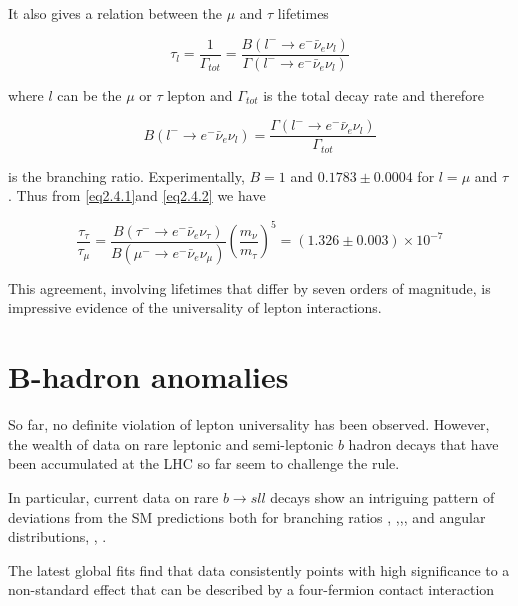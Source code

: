 	It also gives a relation between the $\mu$ and $\tau$ lifetimes 

	\begin{equation}
	\tau_{l}= \frac{1}{\Gamma_{tot}} = \frac{B(l^{-}\rightarrow e^{-}\bar{\nu}_{e}\nu_{l})}{\Gamma(l^{-}\rightarrow e^{-}\bar{\nu}_{e}\nu_{l})}
	\end{equation}

	where $l$ can be the $\mu$ or $\tau$ lepton and $\Gamma_{tot}$ is the total decay rate and therefore

	\begin{equation}
	B(l^{-}\rightarrow e^{-}\bar{\nu}_{e}\nu_{l}) = \frac{\Gamma(l^{-}\rightarrow e^{-}\bar{\nu}_{e}\nu_{l})}{\Gamma_{tot}}
	\end{equation}

	is the branching ratio. Experimentally, $B=1$ and $0.1783\pm0.0004$ for $l=\mu$ and $\tau$\cite{Patrignani:2016xqp}. Thus from \ref{eq2.4.1}and \ref{eq2.4.2} we have

	\begin{equation}
	\frac{\tau_{\tau}}{\tau_{\mu}} = \frac{B(\tau^{-}\rightarrow e^{-}\bar{\nu}_{e}\nu_{\tau})}{B(\mu^{-}\rightarrow e^{-}\bar{\nu}_{e}\nu_{\mu})}(\frac{m_{\nu}}{m_{\tau}})^{5} = (1.326\pm0.003)\times 10^{-7}
	\end{equation}

	This agreement, involving lifetimes that differ by seven orders of magnitude, is impressive evidence of the universality of lepton interactions.

\section{B-hadron anomalies}

	So far, no definite violation of lepton universality has been observed. However, the wealth of data on rare leptonic and semi-leptonic $b$ hadron decays that have been accumulated at the LHC so far seem to challenge the rule.

	In particular, current data on rare $b\rightarrow s l l$ decays show an intriguing pattern of deviations from the SM predictions both for branching ratios \cite{Aaij2014}, \cite{Aaij20162},\cite{PhysRevLett.113.151601},\cite{Aaij2017},\cite{Aaij:2019wad} and angular distributions\cite{PhysRevLett.111.191801}, \cite{Aaij2016}, \cite{Abdesselam:2016llu}.

	The latest global fits find that data consistently points with high significance to a non-standard effect that can be described by a four-fermion contact interaction\cite{Altmannshofer2017} 

